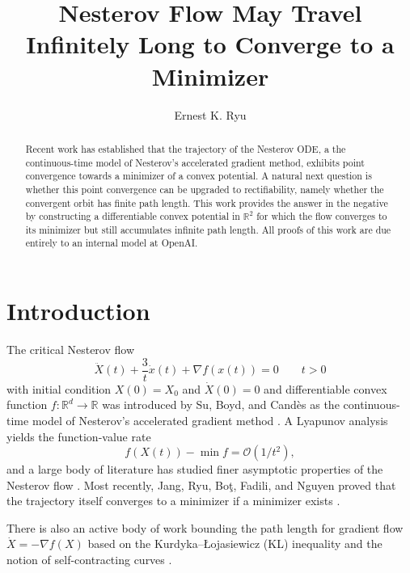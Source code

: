 \documentclass{article}
\title{
Nesterov Flow May Travel Infinitely Long to Converge to a Minimizer
}
\author{Ernest K. Ryu}
\date{}
\theoremstyle{remark}
\begin{document}
\maketitle

\begin{abstract}
Recent work has established that the trajectory of the Nesterov ODE, a the continuous-time model of Nesterov's accelerated gradient method, exhibits point convergence towards a minimizer of a convex potential. A natural next question is whether this point convergence can be upgraded to rectifiability, namely whether the convergent orbit has finite path length. This work provides the answer in the negative by constructing a differentiable convex potential in $\mathbb{R}^2$ for which the flow converges to its minimizer but still accumulates infinite path length. All proofs of this work are due entirely to an internal model at OpenAI.
\end{abstract}


\section{Introduction}

The critical Nesterov flow
\[
  \ddot X(t)+\frac{3}{t}\dot x(t)+\nabla f(x(t))=0
  \qquad t>0
\]
with initial condition $X(0)=X_0$ and $\dot{X}(0)=0$ and differentiable convex function $f\colon\mathbb{R}^d\rightarrow\mathbb{R}$ was introduced by Su, Boyd, and Cand\`es \cite{SuBoydCandes2014,SuBoydCandes2016} as the continuous-time model of Nesterov's accelerated gradient method \cite{Nesterov1983}. 
A Lyapunov analysis yields the function-value rate
\[
  f(X(t)) - \min f = \mathcal{O}(1/t^2),
\]
and a large body of literature has studied finer asymptotic properties of the Nesterov flow \cite{attouch2000heavy,chambolle2015convergence,attouch2015fast,attouch2016fast,may2017asymptotic,AttouchChbaniPeypouquetRedont2018,attouch2019rate,attouch2025recovering}. Most recently, Jang, Ryu, Bo{\c t}, Fadili, and Nguyen 
 proved that the trajectory itself converges to a minimizer if a minimizer exists \cite{JangRyu2025,BotFadiliNguyen2025}.



There is also an active body of work bounding the path length for gradient flow $\dot{X}=-\nabla f(X)$ based on the Kurdyka--{\L}ojasiewicz (KL) inequality \cite{Lojasiewicz1963,Kurdyka1998,BolteDaniilidisLeyMazet2010,AbsilMahonyAndrews2005,AttouchBolteRedontSoubeyran2010,AttouchBolteSvaiter2013,AttouchChbaniPeypouquetRedont2018,AttouchChbaniRiahi2019,DAcuntoKurdyka2021}
and the notion of self-contracting curves 
\cite{ManselliPucci1991,DaniilidisLeySabourau2010,DaniilidisDavidDurandCartagenaLemenant2015,StepanovTeplitskaya2017,GuptaBalakrishnanRamdas2021}.
\end{document}
